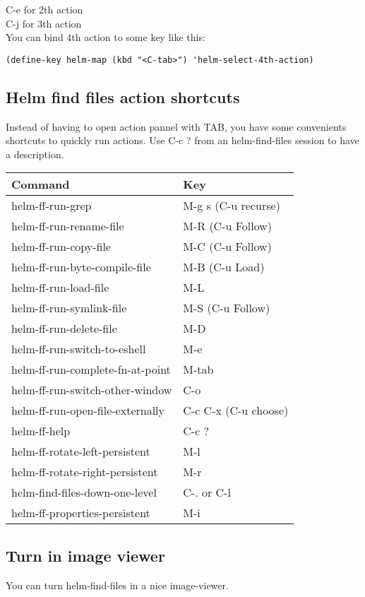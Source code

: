 \documentclass[a4paper,11pt]{article}
\begin{document}
C-e for 2th action\\
C-j for 3th action\\

You can bind 4th action to some key like this:
\begin{verbatim}
(define-key helm-map (kbd "<C-tab>") 'helm-select-4th-action)
\end{verbatim}
\newpage
\subsection{Helm find files action shortcuts}
\label{sec:helm-find-files-1}
Instead of having to open action pannel with TAB, 
you have some convenients shortcuts to quickly run actions.
Use C-c ? from an helm-find-files session to have a description.\\

\begin{tabular}{| l | l |}
  \hline
  Command & Key \\
  \hline
  helm-ff-run-grep & M-g s (C-u recurse)\\
  \hline
  helm-ff-run-rename-file & M-R (C-u Follow)\\
  \hline
  helm-ff-run-copy-file & M-C (C-u Follow)\\
  \hline
  helm-ff-run-byte-compile-file & M-B (C-u Load)\\
  \hline
  helm-ff-run-load-file & M-L \\
  \hline
  helm-ff-run-symlink-file & M-S (C-u Follow)\\
  \hline
  helm-ff-run-delete-file & M-D \\
  \hline
  helm-ff-run-switch-to-eshell & M-e \\
  \hline
  helm-ff-run-complete-fn-at-point & M-tab \\
  \hline
  helm-ff-run-switch-other-window & C-o \\
  \hline
  helm-ff-run-open-file-externally & C-c C-x (C-u choose)\\
  \hline
  helm-ff-help & C-c ? \\
  \hline
  helm-ff-rotate-left-persistent & M-l \\
  \hline
  helm-ff-rotate-right-persistent & M-r \\
  \hline
  helm-find-files-down-one-level & C-. or C-l \\
  \hline
  helm-ff-properties-persistent & M-i \\
  \hline
\end{tabular}
\subsection{Turn in image viewer}
\label{sec:turn-image-viewer}
You can turn helm-find-files in a nice image-viewer.
\end{document}
